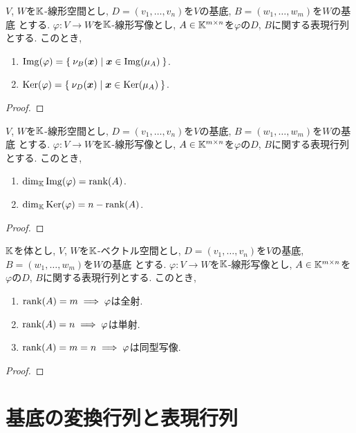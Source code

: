 \begin{prop}
  $V$, $W$を$\mathbb{K}$-線形空間とし,
  $D=(v_1,\ldots,v_n)$を$V$の基底,
  $B=(w_1,\ldots,w_m)$を$W$の基底
  とする.
  $\varphi\colon V\to W$を$\mathbb{K}$-線形写像とし,
  $A\in\mathbb{K}^{m\times n}$を$\varphi$の$D$, $B$に関する表現行列とする.
  このとき,
\begin{enumerate}
  \item $\operatorname{Img}(\varphi)=\Set{\nu_B(\boldsymbol{x}) |\boldsymbol{x}\in \operatorname{Img}(\mu_A)}$.
  \item $\operatorname{Ker}(\varphi)=\Set{\nu_D(\boldsymbol{x}) |\boldsymbol{x}\in \operatorname{Ker}(\mu_A)}$.
\end{enumerate}
\end{prop}
\begin{proof}\end{proof}

\begin{prop}
  $V$, $W$を$\mathbb{K}$-線形空間とし,
  $D=(v_1,\ldots,v_n)$を$V$の基底,
  $B=(w_1,\ldots,w_m)$を$W$の基底
  とする.
  $\varphi\colon V\to W$を$\mathbb{K}$-線形写像とし,
  $A\in\mathbb{K}^{m\times n}$を$\varphi$の$D$, $B$に関する表現行列とする.
  このとき,
\begin{enumerate}
  \item $\dim_{\mathbb{K}}\operatorname{Img}(\varphi)=\operatorname{rank}(A)$.
  \item $\dim_{\mathbb{K}}\operatorname{Ker}(\varphi)=n-\operatorname{rank}(A)$.
\end{enumerate}
\end{prop}
\begin{proof}\end{proof}

\begin{prop}
  $\mathbb{K}$を体とし,
  $V$, $W$を$\mathbb{K}$-ベクトル空間とし,
  $D=(v_1,\ldots,v_n)$を$V$の基底,
  $B=(w_1,\ldots,w_m)$を$W$の基底
  とする.
  $\varphi\colon V\to W$を$\mathbb{K}$-線形写像とし,
  $A\in\mathbb{K}^{m\times n}$を$\varphi$の$D$, $B$に関する表現行列とする.
  このとき,
\begin{enumerate}
  \item $\operatorname{rank}(A)=m\implies \varphi$は全射.
  \item $\operatorname{rank}(A)=n\implies \varphi$は単射.
  \item $\operatorname{rank}(A)=m=n\implies \varphi$は同型写像.
\end{enumerate}
\end{prop}
\begin{proof}\end{proof}

\section{基底の変換行列と表現行列}

